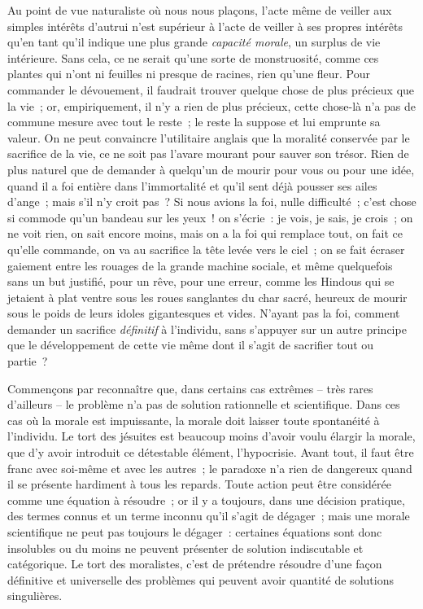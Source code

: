\documentclass[french,twoside]{book} %
\begin{document}
Au point de vue naturaliste où nous nous plaçons, l’acte même de veiller aux simples intérêts d’autrui n’est supérieur à l’acte de veiller à ses propres intérêts qu’en tant qu’il indique une plus grande \emph{capacité morale}, un surplus de vie intérieure. Sans cela, ce ne serait qu’une sorte de monstruosité, comme ces plantes qui n’ont ni feuilles ni presque de racines, rien qu’une fleur. Pour commander le dévouement, il faudrait trouver quelque chose de plus précieux que la vie ; or, empiriquement, il n’y a rien de plus précieux, cette chose-là n’a pas de commune mesure avec tout le reste ; le reste la suppose et lui emprunte sa valeur. On ne peut convaincre l’utilitaire anglais que la moralité conservée par le sacrifice de la vie, ce ne soit pas l’avare mourant pour sauver son trésor. Rien de plus naturel que de demander à quelqu’un de mourir pour vous ou pour une idée, quand il a foi entière dans l’immortalité et qu’il sent déjà pousser ses ailes d’ange ; mais s’il n’y croit pas ? Si nous avions la foi, nulle difficulté ; c’est chose si commode qu’un bandeau sur les yeux ! on s’écrie : je vois, je sais, je crois ; on ne voit rien, on sait encore moins, mais on a la foi qui remplace tout, on fait ce qu’elle commande, on va au sacrifice la tête levée vers le ciel ; on se fait écraser gaiement entre les rouages de la grande machine sociale, et même quelquefois sans un but justifié, pour un rêve, pour une erreur, comme les Hindous qui se jetaient à plat ventre sous les roues sanglantes du char sacré, heureux de mourir sous le poids de leurs idoles gigantesques et vides. N’ayant pas la foi, comment demander un sacrifice \emph{définitif} à l’individu, sans s’appuyer sur un autre principe que le développement de cette vie même dont il s’agit de sacrifier tout ou partie ?\par
Commençons par reconnaître que, dans certains cas extrêmes – très rares d’ailleurs – le problème n’a pas de solution rationnelle et scientifique. Dans ces cas où la morale est impuissante, la morale doit laisser toute spontanéité à l’individu. Le tort des jésuites est beaucoup moins d’avoir voulu élargir la morale, que d’y avoir introduit ce détestable élément, l’hypocrisie. Avant tout, il faut être franc avec soi-même et avec les autres ; le paradoxe n’a rien de dangereux quand il se présente hardiment à tous les repards. Toute action peut être considérée comme une équation à résoudre ; or il y a toujours, dans une décision pratique, des termes connus et un terme inconnu qu’il s’agit de dégager ; mais une morale scientifique ne peut pas toujours le dégager : certaines équations sont donc insolubles ou du moins ne peuvent présenter de solution indiscutable et catégorique. Le tort des moralistes, c’est de prétendre résoudre d’une façon définitive et universelle des problèmes qui peuvent avoir quantité de solutions singulières.\par
\end{document}
